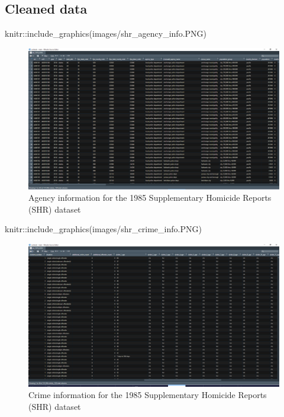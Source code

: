 \documentclass[
  12pt,
  openany]{book}
\newenvironment{Shaded}{\begin{snugshade}}{\end{snugshade}}
\newcommand{\FunctionTok}[1]{\textcolor[rgb]{0,0,0}{#1}}
\newcommand{\NormalTok}[1]{#1}
\newcommand{\SpecialCharTok}[1]{\textcolor[rgb]{0,0,0}{#1}}
\newcommand{\StringTok}[1]{\textcolor[rgb]{0.5,0.5,0.5}{#1}}
\begin{document}
\hypertarget{cleaned-data-3}{%
\subsection{Cleaned data}\label{cleaned-data-3}}

\begin{Shaded}
\begin{Highlighting}[]
\NormalTok{knitr}\SpecialCharTok{::}\FunctionTok{include\_graphics}\NormalTok{(}\StringTok{\textquotesingle{}images/shr\_agency\_info.PNG\textquotesingle{}}\NormalTok{)}
\end{Highlighting}
\end{Shaded}

\begin{figure}
\includegraphics[width=26.62in]{images/shr_agency_info} \caption{Agency information for the 1985 Supplementary Homicide Reports (SHR) dataset}\label{fig:unnamed-chunk-2}
\end{figure}

\begin{Shaded}
\begin{Highlighting}[]
\NormalTok{knitr}\SpecialCharTok{::}\FunctionTok{include\_graphics}\NormalTok{(}\StringTok{\textquotesingle{}images/shr\_crime\_info.PNG\textquotesingle{}}\NormalTok{)}
\end{Highlighting}
\end{Shaded}

\begin{figure}
\includegraphics[width=26.62in]{images/shr_crime_info} \caption{Crime information for the 1985 Supplementary Homicide Reports (SHR) dataset}\label{fig:unnamed-chunk-3}
\end{figure}
\end{document}
